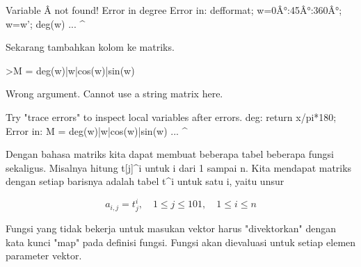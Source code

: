 \documentclass[a4paper,10pt]{article}
\begin{document}
\begin{eulernotebook}
\begin{eulercomment}
\begin{eulercomment}
\begin{eulercomment}
\begin{eulercomment}
\begin{eulercomment}
\begin{eulercomment}
\begin{eulercomment}
\begin{eulercomment}
\begin{eulercomment}
\begin{eulercomment}
\begin{eulercomment}
\begin{eulercomment}
\begin{eulercomment}
\begin{eulercomment}
\begin{eulercomment}
\begin{eulercomment}
\begin{euleroutput}
  Variable Â not found!
  Error in degree
  Error in:
  defformat; w=0Â°:45Â°:360Â°; w=w'; deg(w) ...
                     ^
\end{euleroutput}
\begin{eulercomment}
Sekarang tambahkan kolom ke matriks.
\end{eulercomment}
\begin{eulerprompt}
>M = deg(w)|w|cos(w)|sin(w)
\end{eulerprompt}
\begin{euleroutput}
  Wrong argument.
  Cannot use a string matrix here.
  
  Try "trace errors" to inspect local variables after errors.
  deg:
      return x/pi*180;
  Error in:
  M = deg(w)|w|cos(w)|sin(w) ...
            ^
\end{euleroutput}
\begin{eulercomment}
Dengan bahasa matriks kita dapat membuat beberapa tabel beberapa fungsi
sekaligus. Misalnya hitung t[j]\textasciicircum{}i untuk i dari 1 sampai n. Kita mendapat
matriks dengan setiap barisnya adalah tabel t\textasciicircum{}i untuk satu i, yaitu unsur

\end{eulercomment}
\begin{eulerformula}
\[
a_{i,j} = t_j^i, \quad 1 \le j \le 101, \quad 1 \le i \le n
\]
\end{eulerformula}
\begin{eulercomment}
Fungsi yang tidak bekerja untuk masukan vektor harus "divektorkan" dengan
kata kunci "map" pada definisi fungsi. Fungsi akan dievaluasi untuk setiap
elemen parameter vektor.


\end{eulercomment}
\end{eulercomment}
\end{eulercomment}
\end{eulercomment}
\end{eulercomment}
\end{eulercomment}
\end{eulercomment}
\end{eulercomment}
\end{eulercomment}
\end{eulercomment}
\end{eulercomment}
\end{eulercomment}
\end{eulercomment}
\end{eulercomment}
\end{eulercomment}
\end{eulercomment}
\end{eulercomment}
\end{eulernotebook}
\end{document}
